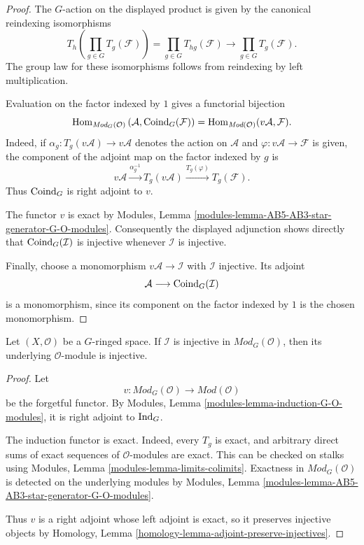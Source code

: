 \begin{proof}
The $G$-action on the displayed product is given by the canonical
reindexing isomorphisms
$$
T_h\left(\prod_{g \in G}T_g(\mathcal{F})\right)
=
\prod_{g \in G}T_{hg}(\mathcal{F})
\longrightarrow
\prod_{g \in G}T_g(\mathcal{F}).
$$
The group law for these isomorphisms follows from reindexing by left
multiplication.

Evaluation on the factor indexed by $1$ gives a functorial bijection
$$
\mathop{\mathrm{Hom}}\nolimits_{\textit{Mod}_G(\mathcal{O})}
\left(\mathcal{A},
\mathop{\rm Coind}\nolimits_G(\mathcal{F})\right)
=
\mathop{\mathrm{Hom}}\nolimits_{\textit{Mod}(\mathcal{O})}(v\mathcal{A},\mathcal{F}).
$$
Indeed, if
$\alpha_g:T_g(v\mathcal{A})\to v\mathcal{A}$
denotes the action on $\mathcal{A}$ and
$\varphi:v\mathcal{A}\to\mathcal{F}$ is given, the component of the
adjoint map on the factor indexed by $g$ is
$$
v\mathcal{A}
\xrightarrow{\alpha_g^{-1}}
T_g(v\mathcal{A})
\xrightarrow{T_g(\varphi)}
T_g(\mathcal{F}).
$$
Thus $\mathop{\rm Coind}\nolimits_G$ is right adjoint to $v$.

The functor $v$ is exact by Modules, Lemma
\ref{modules-lemma-AB5-AB3-star-generator-G-O-modules}.
Consequently the displayed adjunction shows directly that
$\mathop{\rm Coind}\nolimits_G(\mathcal{I})$ is injective whenever
$\mathcal{I}$ is injective.

Finally, choose a monomorphism
$v\mathcal{A}\to\mathcal{I}$ with $\mathcal{I}$ injective. Its adjoint
$$
\mathcal{A}\longrightarrow
\mathop{\rm Coind}\nolimits_G(\mathcal{I})
$$
is a monomorphism, since its component on the factor indexed by $1$ is
the chosen monomorphism.
\end{proof}

\begin{lemma}
\label{lemma-equivariant-injective-underlying}
\begin{reference}
\cite[Chapter V, \S 5.6, Lemma 5.6.2, pp. 216--217]{Tohoku}
\end{reference}
Let $(X, \mathcal{O})$ be a $G$-ringed space. If $\mathcal{I}$ is
injective in $\textit{Mod}_G(\mathcal{O})$, then its underlying
$\mathcal{O}$-module is injective.
\end{lemma}

\begin{proof}
Let
$$
v : \textit{Mod}_G(\mathcal{O}) \longrightarrow
\textit{Mod}(\mathcal{O})
$$
be the forgetful functor. By Modules, Lemma
\ref{modules-lemma-induction-G-O-modules}, it is right adjoint to
$\mathop{\rm Ind}\nolimits_G$.

The induction functor is exact. Indeed, every $T_g$ is exact, and arbitrary
direct sums of exact sequences of $\mathcal{O}$-modules are exact. This can
be checked on stalks using Modules, Lemma
\ref{modules-lemma-limits-colimits}. Exactness in
$\textit{Mod}_G(\mathcal{O})$ is detected on the underlying modules by
Modules, Lemma
\ref{modules-lemma-AB5-AB3-star-generator-G-O-modules}.

Thus $v$ is a right adjoint whose left adjoint is exact, so it preserves
injective objects by Homology, Lemma
\ref{homology-lemma-adjoint-preserve-injectives}.
\end{proof}

